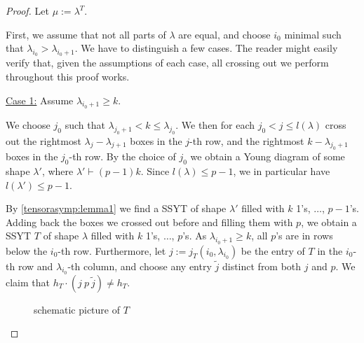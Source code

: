 \documentclass[a4paper]{amsart}
\begin{document}
\begin{proof}
	Let $\mu:=\lambda^T$.
	
	First, we assume that not all parts of $\lambda$ are equal,
	and choose $i_0$ minimal such that $\lambda_{i_0}>\lambda_{i_0+1}$.
	We have to distinguish a few cases.
	The reader might easily verify that, given the assumptions of each case, all crossing out we perform throughout this proof works.
	
	\underline{Case 1:} Assume $\lambda_{i_0+1}\geq k$.
	
	We choose $j_0$ such that $\lambda_{j_0+1}<k\leq\lambda_{j_0}$.
	We then for each $j_0<j\leq l(\lambda)$ cross out the rightmost $\lambda_{j}-\lambda_{j+1}$ boxes in the $j$-th row,
	and the rightmost $k-\lambda_{j_0+1}$ boxes in the $j_0$-th row.
	By the choice of $j_0$
	we obtain a Young diagram of some shape $\lambda'$, where $\lambda'\vdash (p-1)k$.
	Since $l(\lambda)\leq p-1$, we in particular have $l(\lambda')\leq p-1$.
	
	
	By \cref{tensorasymp:lemma1} we find a SSYT of shape $\lambda'$ filled with $k$ 1's, $\ldots$, $p-1$'s.
	Adding back the boxes we crossed out before and filling them with $p$, we obtain a SSYT $T$ of shape $\lambda$ filled with $k$ 1's, $\ldots$, $p$'s.
	As $\lambda_{i_0+1}\geq k$, all $p$'s are in rows below the $i_0$-th row.
	Furthermore, let $j:=j_T(i_0,\lambda_{i_0})$ be the entry of $T$ in the $i_0$-th row and $\lambda_{i_0}$-th column, and choose any entry $\tilde j$ distinct from both $j$ and $p$.
	We claim that $h_T\cdot (j\ p\ \tilde j)\neq h_T$.
	
	\begin{figure}[H]
		\centering
		\caption*{schematic picture of $T$}
	\end{figure}


\end{proof}
\end{document}
